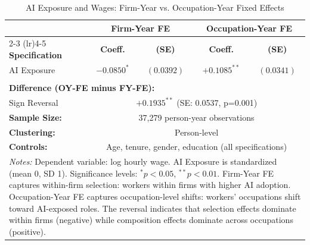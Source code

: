 \begin{table}[htbp]
\centering
\caption{AI Exposure and Wages: Firm-Year vs. Occupation-Year Fixed Effects}
\label{tab:main_results}
\begin{tabular}{lcccc}
\toprule
& \multicolumn{2}{c}{\textbf{Firm-Year FE}} & \multicolumn{2}{c}{\textbf{Occupation-Year FE}} \\
\cmidrule(lr){2-3} \cmidrule(lr){4-5}
\textbf{Specification} & \textbf{Coeff.} & \textbf{(SE)} & \textbf{Coeff.} & \textbf{(SE)} \\
\midrule
AI Exposure & $-0.0850^*$ & $(0.0392)$ & $+0.1085^{**}$ & $(0.0341)$ \\
& \multicolumn{2}{c}{} & \multicolumn{2}{c}{} \\
\multicolumn{5}{l}{\textbf{Difference (OY-FE minus FY-FE):}} \\
Sign Reversal & \multicolumn{4}{c}{$+0.1935^{**}$ (SE: 0.0537, p=0.001)} \\
\midrule
\textbf{Sample Size:} & \multicolumn{4}{c}{37,279 person-year observations} \\
\textbf{Clustering:} & \multicolumn{4}{c}{Person-level} \\
\textbf{Controls:} & \multicolumn{4}{c}{Age, tenure, gender, education (all specifications)} \\
\bottomrule
\multicolumn{5}{p{\textwidth}}{\footnotesize \textit{Notes:}
Dependent variable: log hourly wage. AI Exposure is standardized (mean 0, SD 1).
Significance levels: $^* p<0.05$, $^{**} p<0.01$.
Firm-Year FE captures within-firm selection: workers within firms with higher AI adoption.
Occupation-Year FE captures occupation-level shifts: workers' occupations shift toward AI-exposed roles.
The reversal indicates that selection effects dominate within firms (negative) while composition effects dominate across occupations (positive).
}
\end{tabular}
\end{table}
